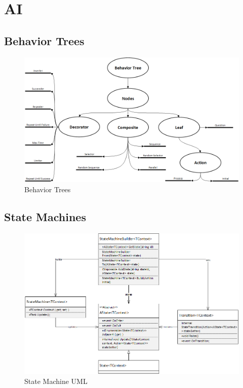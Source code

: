 \section{ΑΙ}


\subsection{Behavior Trees}	

\begin{figure}[h!]
	\centering
	\includegraphics[width=165mm]{Images/behavior_trees}
	\caption{Behavior Trees}
	\label{fig:behavior_trees}
\end{figure}
	
\subsection{State Machines}	

\begin{figure}[h!]
	\centering
	\includegraphics[width=165mm]{Images/state_machine_uml}
	\caption{State Machine UML}
	\label{fig:state_machine_uml}
\end{figure}	


